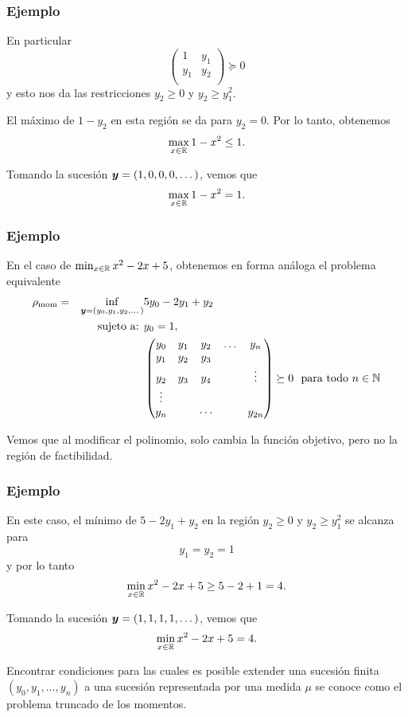 \documentclass[aspectratio=169,12pt,spanish]{beamer}
\begin{document}
\begin{frame}

\frametitle{Ejemplo}

En particular 
$$\begin{pmatrix}
   1 & y_1 \\
   y_1 & y_2 \\
   \end{pmatrix} \succeq 0 
$$ 
y esto nos da las restricciones $y_2 \ge 0$ y $y_2 \ge y_1^2$.

El máximo de $1 - y_2$ en esta región se da para $y_2 = 0$. Por lo tanto, obtenemos $$\max_{x \in \mathbb{R}} 1 - x^2 \le 1.$$

Tomando la sucesión $\bm{y} = (1, 0, 0, 0, \dots)$, vemos que $$\max_{x \in \mathbb{R}} 1 - x^2 = 1.$$

\end{frame}


\begin{frame}

\frametitle{Ejemplo}

En el caso de $\min_{x \in \mathbb{R}} x^2 - 2x + 5$, obtenemos en forma análoga el problema equivalente
\begin{alignat*}{2}
  \rho_{\text{mom}} = & & \inf_{\bm{y} = (y_0, y_1, y_2, \dots)} & 5 y_0 - 2 y_ 1 + y_2   \\
   & & \text{sujeto a: } & y_0 = 1, \\
   &&& \begin{pmatrix}
   y_0 & y_1 & y_2 & \dots & y_n\\
   y_1 & y_2 & y_3 & &  \\
   y_2 & y_3 & y_4 & &\vdots \\
   \vdots & &  &  & \\
   y_n & & \cdots &  & y_{2n}
   \end{pmatrix} \succeq 0 \ \text{ para todo } n \in \mathbb{N}
\end{alignat*}

Vemos que al modificar el polinomio, solo cambia la función objetivo, pero no la región de factibilidad.
\end{frame}


\begin{frame}

\frametitle{Ejemplo}

En este caso, el mínimo de $5 - 2 y_ 1 + y_2$ en la región $y_2 \ge 0$ y $y_2 \ge y_1^2$ se alcanza para
$$
y_1 = y_2 = 1
$$
y por lo tanto $$\min_{x \in \mathbb{R}} x^2 - 2x + 5 \ge 5 - 2 + 1 = 4.$$

Tomando la sucesión $\bm{y} = (1, 1, 1, 1, \dots)$, vemos que $$\min_{x \in \mathbb{R}} x^2 - 2x + 5 = 4.$$

Encontrar condiciones para las cuales es posible extender una sucesión finita $(y_0, y_1, \dots, y_n)$ a una sucesión representada por una medida $\mu$ se conoce como el problema truncado de los momentos.

\end{frame}
\end{document}

